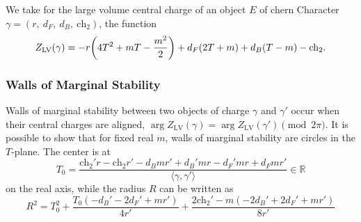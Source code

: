 \documentclass[11pt, a4paper]{article}
\newcommand{\ch}{\mathrm{ch}}
\newcommand{\LV}{\mathrm{LV}}
\numberwithin{equation}{section}
\begin{document}
We take for the large volume central charge of an object $E$ of chern Character $\gamma = (r, \ d_F, \ d_B, \ \ch_2)$, the function
\begin{equation}\label{eq:LVCentralCharge}
  Z_\LV(\gamma) = -r \qty(4 T^2 + m T - \frac{m^2}{2}) + d_F (2T+m) + d_B(T-m) - \ch_2.
\end{equation}

\subsubsection{Walls of Marginal Stability}
Walls of marginal stability between two objects of charge $\gamma$ and $\gamma'$ occur when their central charges are aligned, $\arg Z_\LV(\gamma) = \arg Z_\LV(\gamma') \pmod{2\pi}$. It is possible to show that for fixed real $m$, walls of marginal stability are circles in the $T$-plane. The center is at
\begin{equation}
  T_0 = \frac{\ch_2' r-\ch_2 r'-d_B m r'+d_B' m r-d_F' m r+d_F m r'}{\langle \gamma, \gamma' \rangle} \in \mathbb{R}
\end{equation}
on the real axis, while the radius $R$ can be written as
\begin{equation}
  R^2 = T_0^2 + \frac{T_0 (-d_B'-2 d_F'+m r')}{4 r'} + \frac{2 \ch_2'-m (-2 d_B'+2 d_F'+m r')}{8 r'}
\end{equation}
\end{document}
